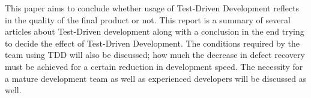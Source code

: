 This paper aims to conclude whether usage of Test-Driven Development reflects in the quality of the final product or not. This report is a summary of several articles about Test-Driven development along with a conclusion in the end trying to decide the effect of Test-Driven Development. The conditions required by the team using TDD will also be discussed; how much the decrease in defect recovery must be achieved for a certain reduction in development speed. The necessity for a mature development team as well as experienced developers will be discussed as well.